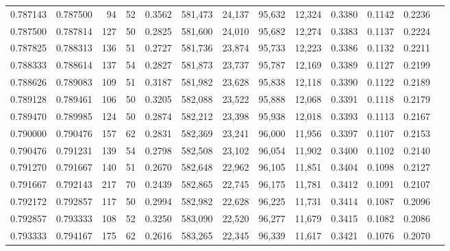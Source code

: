 \begin{tabular}{rrrrrrrrrrrrr}
0.787143 & 0.787500 &     94 &    52 &                                     0.3562 & 581,473 &  24,137 &  95,632 &  12,324 & 0.3380 & 0.1142 & 0.2236 \\
0.787500 & 0.787814 &    127 &    50 &                                     0.2825 & 581,600 &  24,010 &  95,682 &  12,274 & 0.3383 & 0.1137 & 0.2224 \\
0.787825 & 0.788313 &    136 &    51 &                                     0.2727 & 581,736 &  23,874 &  95,733 &  12,223 & 0.3386 & 0.1132 & 0.2211 \\
0.788333 & 0.788614 &    137 &    54 &                                     0.2827 & 581,873 &  23,737 &  95,787 &  12,169 & 0.3389 & 0.1127 & 0.2199 \\
0.788626 & 0.789083 &    109 &    51 &                                     0.3187 & 581,982 &  23,628 &  95,838 &  12,118 & 0.3390 & 0.1122 & 0.2189 \\
0.789128 & 0.789461 &    106 &    50 &                                     0.3205 & 582,088 &  23,522 &  95,888 &  12,068 & 0.3391 & 0.1118 & 0.2179 \\
0.789470 & 0.789985 &    124 &    50 &                                     0.2874 & 582,212 &  23,398 &  95,938 &  12,018 & 0.3393 & 0.1113 & 0.2167 \\
0.790000 & 0.790476 &    157 &    62 &                                     0.2831 & 582,369 &  23,241 &  96,000 &  11,956 & 0.3397 & 0.1107 & 0.2153 \\
0.790476 & 0.791231 &    139 &    54 &                                     0.2798 & 582,508 &  23,102 &  96,054 &  11,902 & 0.3400 & 0.1102 & 0.2140 \\
0.791270 & 0.791667 &    140 &    51 &                                     0.2670 & 582,648 &  22,962 &  96,105 &  11,851 & 0.3404 & 0.1098 & 0.2127 \\
0.791667 & 0.792143 &    217 &    70 &                                     0.2439 & 582,865 &  22,745 &  96,175 &  11,781 & 0.3412 & 0.1091 & 0.2107 \\
0.792172 & 0.792857 &    117 &    50 &                                     0.2994 & 582,982 &  22,628 &  96,225 &  11,731 & 0.3414 & 0.1087 & 0.2096 \\
0.792857 & 0.793333 &    108 &    52 &                                     0.3250 & 583,090 &  22,520 &  96,277 &  11,679 & 0.3415 & 0.1082 & 0.2086 \\
0.793333 & 0.794167 &    175 &    62 &                                     0.2616 & 583,265 &  22,345 &  96,339 &  11,617 & 0.3421 & 0.1076 & 0.2070 \\

\end{tabular}
